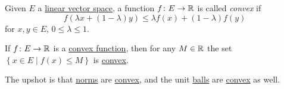 \begin{definition}\label{def:convex-function}
	Given \(E\) a \hyperref[def:linear-vector-space]{linear vector space}, a function \(f\colon E\to \mathbb{\MakeUppercase{r}} \) is called \emph{convex} if
	\[
		f(\lambda x + (1 - \lambda )y) \leq \lambda f(x) + (1 - \lambda )f(y)
	\]
	for \(x, y\in E\), \(0 \leq \lambda \leq 1\).
\end{definition}

\begin{remark}
	If \(f\colon E \to \mathbb{\MakeUppercase{r}} \) is a \hyperref[def:convex-function]{convex function}, then for any \(M\in \mathbb{\MakeUppercase{r}} \) the set \(\left\{ x\in E\mid f(x) \leq M \right\} \) is \hyperref[def:convex-set]{convex}.
\end{remark}

The upshot is that \hyperref[def:norm]{norms} are \hyperref[def:convex-function]{convex}, and the unit \hyperref[def:ball]{balls} are \hyperref[def:convex-set]{convex} as well.
